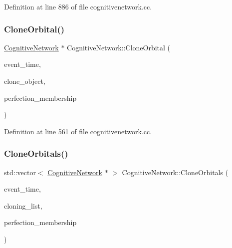 Definition at line 886 of file cognitivenetwork.\+cc.

\mbox{\label{class_cognitive_network_aa8992740f25d46b0be3d9d8344c39f67}} 
\subsubsection{\texorpdfstring{Clone\+Orbital()}{CloneOrbital()}}
{\footnotesize\ttfamily \mbox{\hyperlink{class_cognitive_network}{Cognitive\+Network}} $\ast$ Cognitive\+Network\+::\+Clone\+Orbital (\begin{DoxyParamCaption}\item[{std\+::chrono\+::time\+\_\+point$<$ \mbox{\hyperlink{universe_8h_a0ef8d951d1ca5ab3cfaf7ab4c7a6fd80}{Clock}} $>$}]{event\+\_\+time,  }\item[{\mbox{\hyperlink{class_cognitive_network}{Cognitive\+Network}} $\ast$}]{clone\+\_\+object,  }\item[{double}]{perfection\+\_\+membership }\end{DoxyParamCaption})}



Definition at line 561 of file cognitivenetwork.\+cc.

\mbox{\label{class_cognitive_network_a266b7baf2fd9d6b5c5652e251830020a}} 
\subsubsection{\texorpdfstring{Clone\+Orbitals()}{CloneOrbitals()}}
{\footnotesize\ttfamily std\+::vector$<$ \mbox{\hyperlink{class_cognitive_network}{Cognitive\+Network}} $\ast$ $>$ Cognitive\+Network\+::\+Clone\+Orbitals (\begin{DoxyParamCaption}\item[{std\+::chrono\+::time\+\_\+point$<$ \mbox{\hyperlink{universe_8h_a0ef8d951d1ca5ab3cfaf7ab4c7a6fd80}{Clock}} $>$}]{event\+\_\+time,  }\item[{std\+::vector$<$ \mbox{\hyperlink{class_cognitive_network}{Cognitive\+Network}} $\ast$$>$}]{cloning\+\_\+list,  }\item[{double}]{perfection\+\_\+membership }\end{DoxyParamCaption})}



